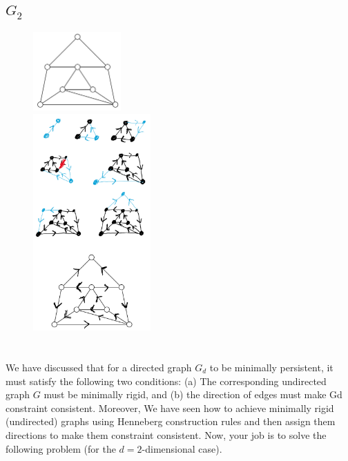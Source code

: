 \documentclass[]{article}
\numberwithin{equation}{section}
\begin{document}
\subsection{$G_2$}
\begin{figure}[h]
    \centering
    \includegraphics[width=0.3\textwidth]{figs/pblm2_G2.png}\\
    \includegraphics[width=0.4\textwidth]{figs/pblm2_G2_soln.png}
\end{figure}

\newpage
\section{}
We have discussed that for a directed graph $G_d$ to be minimally persistent, it must satisfy the following two conditions: 
(a) The corresponding undirected graph $G$ must be minimally rigid, and 
(b) the direction of edges must make Gd constraint consistent. 
Moreover, We have seen how to achieve minimally rigid (undirected) graphs using Henneberg construction rules and then assign them directions to make them constraint consistent. 
Now, your job is to solve the following problem (for the $d = 2$-dimensional case).
\end{document}
